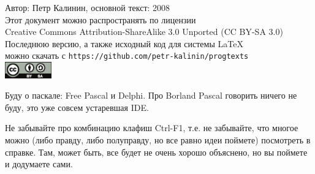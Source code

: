 \documentclass[a4paper,10pt]{problems}
\begin{document}

\begin{flushright}
Автор: Петр Калинин, основной текст: 2008\\
Этот документ можно распространять по лицензии\\
Creative Commons Attribution-ShareAlike 3.0 Unported (CC BY-SA 3.0)\\
Последнюю версию, а также исходный код для системы \LaTeX\\
можно скачать с \verb`https://github.com/petr-kalinin/progtexts`\\
\includegraphics[width=2cm]{by-sa-corr.eps}
\end{flushright}





Буду о паскале: Free Pascal и Delphi. Про Borland Pascal говорить ничего не буду, это уже совсем 
устаревшая IDE.

Не забывайте про комбинацию клафиш Ctrl-F1, т.е. не забывайте, что многое можно (либо 
правду, либо полуправду, но все равно идеи поймете) посмотреть в справке. Там, может быть, все 
будет не очень хорошо объяснено, но вы поймете и додумаете сами.















\end{document}
